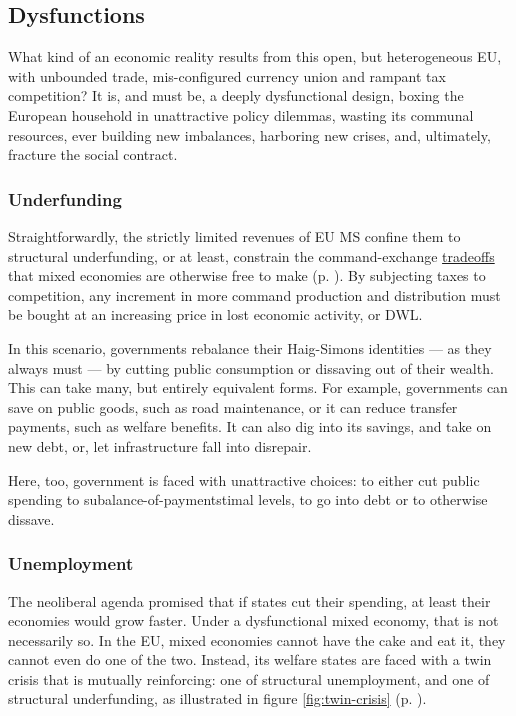 \documentclass[11pt,a4paper,oneside,openright]{article}
\begin{document}
\subsection{Dysfunctions} \label{sec:defunct} What kind of an economic reality results from this open, but heterogeneous \gls{EU}, with unbounded trade, mis-configured currency union and rampant tax competition? 
It is, and must be, a deeply dysfunctional design, boxing the European household in unattractive policy dilemmas, wasting its communal resources, ever building new imbalances, harboring new crises, and, ultimately, fracture the social contract.

\subsubsection{Underfunding} \label{sec:public-squalor} Straightforwardly, the strictly limited revenues of \gls{EU} \gls{MS} confine them to structural underfunding, or at least, constrain the command-exchange \hyperref[sec:tradeoffs]{tradeoffs} that mixed economies are otherwise free to make (p. \pageref{sec:tradeoffs}). %
By subjecting taxes to competition, any increment in more command production and distribution must be bought at an increasing price in lost economic activity, or \gls{DWL}. 

In this scenario, governments rebalance their Haig-Simons identities --- as they always must --- by cutting public consumption or dissaving out of their wealth. 
This can take many, but entirely equivalent forms. 
For example, governments can save on public goods, such as road maintenance, or it can reduce transfer payments, such as welfare benefits. 
It can also dig into its savings, and take on new debt, or, let infrastructure fall into disrepair.

Here, too, government is faced with unattractive choices: 
to either cut public spending to subalance-of-paymentstimal levels, to go into debt or to otherwise dissave.


\subsubsection{Unemployment}
The neoliberal agenda promised that if states cut their spending, at least their economies would grow faster. 
Under a dysfunctional mixed economy, that is not necessarily so. 
In the \gls{EU}, mixed economies cannot have the cake and eat it, they cannot even do one of the two. 
Instead, its welfare states are faced with a twin crisis that is mutually reinforcing: 
one of structural unemployment, and one of structural underfunding, as illustrated in figure \ref{fig:twin-crisis} (p. \pageref{fig:twin-crisis}). 
\end{document}
